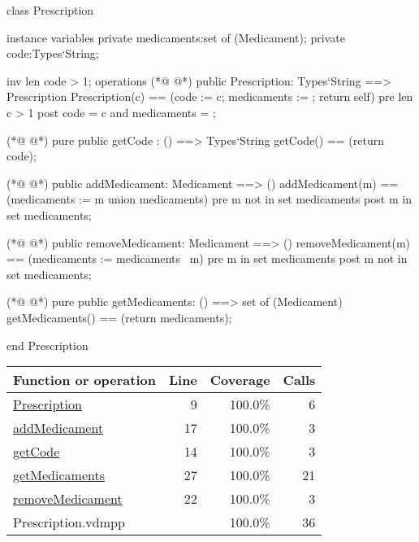 \begin{vdmpp}[breaklines=true]
class Prescription

instance variables
  private medicaments:set of (Medicament);
  private code:Types`String;
  
  inv len code > 1;
operations
(*@
\label{Prescription:9}
@*)
 public Prescription: Types`String ==> Prescription
  Prescription(c) == (code := c; medicaments := {}; return self)
 pre len c > 1
 post code = c and medicaments = {};
 
(*@
\label{getCode:14}
@*)
 pure public getCode : () ==> Types`String
  getCode() == (return code);
  
(*@
\label{addMedicament:17}
@*)
 public addMedicament: Medicament ==> ()
  addMedicament(m) == (medicaments := {m} union medicaments)
 pre m not in set medicaments
 post m in set medicaments;
  
(*@
\label{removeMedicament:22}
@*)
 public removeMedicament: Medicament ==> ()
  removeMedicament(m) == (medicaments := medicaments \ {m})
 pre m in set medicaments
 post m not in set medicaments;
  
(*@
\label{getMedicaments:27}
@*)
 pure public getMedicaments: () ==> set of (Medicament)
  getMedicaments() == (return medicaments);

end Prescription
\end{vdmpp}
\bigskip
\begin{longtable}{|l|r|r|r|}
\hline
Function or operation & Line & Coverage & Calls \\
\hline
\hline
\hyperref[Prescription:9]{Prescription} & 9&100.0\% & 6 \\
\hline
\hyperref[addMedicament:17]{addMedicament} & 17&100.0\% & 3 \\
\hline
\hyperref[getCode:14]{getCode} & 14&100.0\% & 3 \\
\hline
\hyperref[getMedicaments:27]{getMedicaments} & 27&100.0\% & 21 \\
\hline
\hyperref[removeMedicament:22]{removeMedicament} & 22&100.0\% & 3 \\
\hline
\hline
Prescription.vdmpp & & 100.0\% & 36 \\
\hline
\end{longtable}

